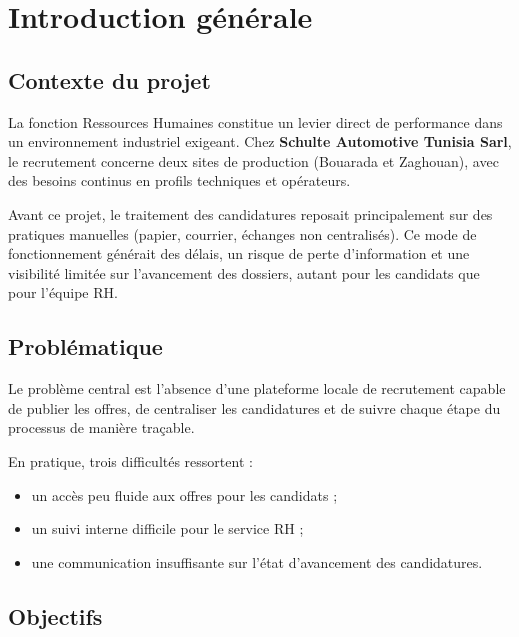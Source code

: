 \chapter*{Introduction générale}

\section*{Contexte du projet}

La fonction Ressources Humaines constitue un levier direct de performance
dans un environnement industriel exigeant. Chez
\textbf{Schulte Automotive Tunisia Sarl}, le recrutement concerne deux
sites de production (Bouarada et Zaghouan), avec des besoins continus en
profils techniques et opérateurs.

Avant ce projet, le traitement des candidatures reposait principalement sur
des pratiques manuelles (papier, courrier, échanges non centralisés). Ce
mode de fonctionnement générait des délais, un risque de perte
d'information et une visibilité limitée sur l'avancement des dossiers,
autant pour les candidats que pour l'équipe RH.

\section*{Problématique}

Le problème central est l'absence d'une plateforme locale de recrutement
capable de publier les offres, de centraliser les candidatures et de
suivre chaque étape du processus de manière traçable.

En pratique, trois difficultés ressortent :
\begin{itemize}
    \item un accès peu fluide aux offres pour les candidats ;
    \item un suivi interne difficile pour le service RH ;
    \item une communication insuffisante sur l'état d'avancement des candidatures.
\end{itemize}

\section*{Objectifs}

